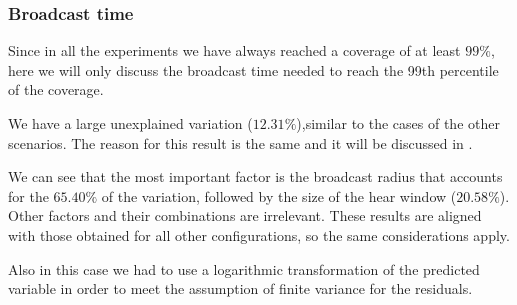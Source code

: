 \subsubsection{Broadcast time}\label{subsubsec:rect2krtime}

Since in all the experiments we have always reached a coverage of at least
\(99\%\), here we will only discuss the broadcast time needed to reach the 99th
percentile of the coverage.

We have a large unexplained variation (\(12.31\%\)),similar to the cases of the
other scenarios. The reason for this result is the same and it will be discussed
in .

We can see that the most important factor is the broadcast radius that accounts
for the \(65.40\%\) of the variation, followed by the size of the hear window
(\(20.58\%\)). Other factors and their combinations are irrelevant. These
results are aligned with those obtained for all other configurations, so the
same considerations apply.

Also in this case we had to use a logarithmic transformation of the predicted
variable in order to meet the assumption of finite variance for the residuals.
